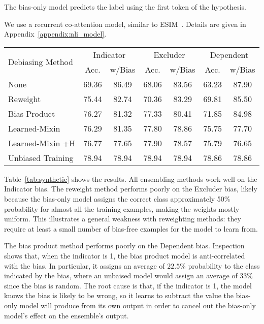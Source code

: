 \documentclass[11pt,a4paper]{article}
\begin{document}
 The bias-only model predicts the label using the first token of the hypothesis. 

 We use a recurrent co-attention model, similar to ESIM~\cite{chen2016enhanced}. Details are given in Appendix~\ref{appendix:nli_model}.

\begin{table*}
\centering
\tablefont
\begin{tabular}{lcccccc} \toprule
\multirow{2}{*}{Debiasing Method} & \multicolumn{2}{c}{Indicator} & \multicolumn{2}{c}{Excluder} & \multicolumn{2}{c}{Dependent}\\ 
 & Acc. & w/Bias & Acc. & w/Bias & Acc. & w/Bias\\ \midrule
None & 69.36 & 86.49 & 68.06 & 83.56 & 63.23 & 87.90 \\
Reweight & 75.44 & 82.74 & 70.36 & 83.29 & 69.81 & 85.50 \\
Bias Product & 76.27 & 81.32 & 77.33 & 80.41 & 71.85 & 84.98 \\
Learned-Mixin & 76.29 & 81.35 & 77.80 & 78.86 & 75.75 & 77.70 \\
Learned-Mixin +H & 76.77 & 77.65 & 77.90 & 78.57 & 75.79 & 76.65 \\ \hdashline
Unbiased Training & 78.94 & 78.94 & 78.94 & 78.94 & 78.86 & 78.86 \\
\bottomrule
\end{tabular}

\caption{Results on MNLI with different kinds of synthetic bias. The Acc columns show the accuracy on the out-of-domain test set, and the w/Bias columns show accuracy on the in-domain test. Unbiased Training is an upper bound constructed by training a model with the same randomized features that are used at test time.}
\label{tab:synthetic}
\end{table*}
 
 Table~\ref{tab:synthetic} shows the results.
All ensembling methods work well on the Indicator bias. The reweight method performs poorly on the Excluder bias, likely because the bias-only model assigns the correct class approximately 50\% probability for almost all the training examples, making the weights mostly uniform. 
This illustrates a general weakness with reweighting methods: they require at least a small number of bias-free examples for the model to learn from.


The bias product method performs poorly on the Dependent bias.
Inspection shows that, when the indicator is 1, the bias product model is anti-correlated with the bias. In particular, it assigns an average of $22.5\%$ probability to the class indicated by the bias, where an unbaised model would assign an average of $33\%$ since the bias is random.
The root cause is that, if the indicator is 1, the model knows the bias is likely to be wrong, so it learns to subtract the value the bias-only model will produce from its own output in order to cancel out the bias-only model's effect on the ensemble's output. 
\end{document}
